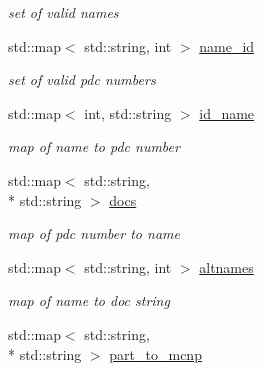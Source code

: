 \begin{DoxyCompactItemize}
\begin{DoxyCompactList}\small\item\em set of valid names \end{DoxyCompactList}\item 
\hypertarget{namespacepyne_1_1particle_a649721d363b978995fb05f8007e4ecfb}{std\-::map$<$ std\-::string, int $>$ \hyperlink{namespacepyne_1_1particle_a649721d363b978995fb05f8007e4ecfb}{name\-\_\-id}}\label{namespacepyne_1_1particle_a649721d363b978995fb05f8007e4ecfb}

\begin{DoxyCompactList}\small\item\em set of valid pdc numbers \end{DoxyCompactList}\item 
\hypertarget{namespacepyne_1_1particle_adfacb4f56580ef9aa94b6cf6970ac366}{std\-::map$<$ int, std\-::string $>$ \hyperlink{namespacepyne_1_1particle_adfacb4f56580ef9aa94b6cf6970ac366}{id\-\_\-name}}\label{namespacepyne_1_1particle_adfacb4f56580ef9aa94b6cf6970ac366}

\begin{DoxyCompactList}\small\item\em map of name to pdc number \end{DoxyCompactList}\item 
\hypertarget{namespacepyne_1_1particle_a1134f614fd50d48b1583634857ebc775}{std\-::map$<$ std\-::string, \\*
std\-::string $>$ \hyperlink{namespacepyne_1_1particle_a1134f614fd50d48b1583634857ebc775}{docs}}\label{namespacepyne_1_1particle_a1134f614fd50d48b1583634857ebc775}

\begin{DoxyCompactList}\small\item\em map of pdc number to name \end{DoxyCompactList}\item 
\hypertarget{namespacepyne_1_1particle_a848d7127667430bd7fa3896ea4145639}{std\-::map$<$ std\-::string, int $>$ \hyperlink{namespacepyne_1_1particle_a848d7127667430bd7fa3896ea4145639}{altnames}}\label{namespacepyne_1_1particle_a848d7127667430bd7fa3896ea4145639}

\begin{DoxyCompactList}\small\item\em map of name to doc string \end{DoxyCompactList}\item 
\hypertarget{namespacepyne_1_1particle_ab46830f83783c4230c4d30a290d8c5fc}{std\-::map$<$ std\-::string, \\*
std\-::string $>$ \hyperlink{namespacepyne_1_1particle_ab46830f83783c4230c4d30a290d8c5fc}{part\-\_\-to\-\_\-mcnp}}\label{namespacepyne_1_1particle_ab46830f83783c4230c4d30a290d8c5fc}


\end{DoxyCompactItemize}
